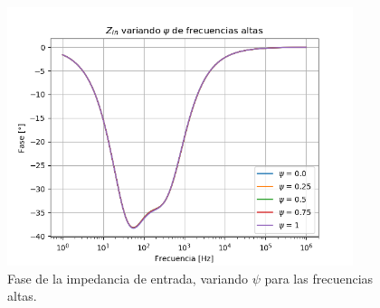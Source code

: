 \documentclass[a4paper]{article}
\begin{document}
\begin{figure}[H]
\centering
	\includegraphics[width=0.9\textwidth, trim = {0 0 0 1.35cm}, clip]{Imagenes/Zin-High-Ph.png}
	\caption{Fase de la impedancia de entrada, variando $\psi$ para las frecuencias altas.}
	\label{fig:zin_ph_high}
\end{figure}
\end{document}
